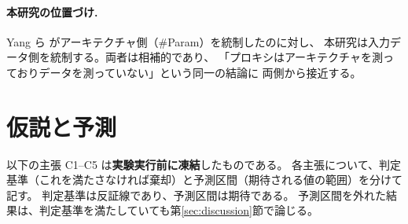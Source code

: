 \documentclass[11pt]{article}
\begin{document}
\paragraph{本研究の位置づけ.}
Yang ら \cite{yang2023revisiting} がアーキテクチャ側（\#Param）を統制したのに対し、
本研究は入力データ側を統制する。両者は相補的であり、
「プロキシはアーキテクチャを測っておりデータを測っていない」という同一の結論に
両側から接近する。

\section{仮説と予測}
\label{sec:claims}

以下の主張 C1--C5 は\textbf{実験実行前に凍結}したものである。
各主張について、判定基準（これを満たさなければ棄却）と予測区間（期待される値の範囲）を分けて記す。
判定基準は反証線であり、予測区間は期待である。
予測区間を外れた結果は、判定基準を満たしていても第\ref{sec:discussion}節で論じる。
\end{document}
